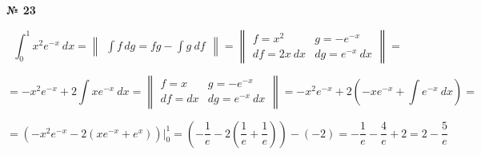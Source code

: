 \documentclass{article}
\begin{document}
\textbf{№ 23} 
\large

$$ \int_{0}^{1} x^2e^{-x} \ dx 
= \begin{Vmatrix} \int f \,dg = fg - \int g \ df \end{Vmatrix} =
  \begin{Vmatrix} f = x^2 &  g = -e^{-x} \\
                 df = 2x \ dx  & dg = e^{-x} \ dx \end{Vmatrix} 
= $$

$$ = -x^2e^{-x} + 2 \int x e^{-x} \ dx 
= \begin{Vmatrix} f = x &  g = -e^{-x} \\
                  df = dx  & dg = e^{-x} \ dx \end{Vmatrix}
= -x^2e^{-x} + 2 \left( -xe^{-x} + \int e^{-x} \ dx \right) 
= $$

$$ = \left( -x^2e^{-x} - 2  \left( xe^{-x} + e^{x} \right) \right) \bigg\vert_{0}^{1} 
= \left( -\frac{1}{e} - 2  \left(\frac{1}{e} + \frac{1}{e} \right) \right) - (-2) 
= -\frac{1}{e} - \frac{4}{e} + 2
= 2 - \frac{5}{e} $$
\end{document}
